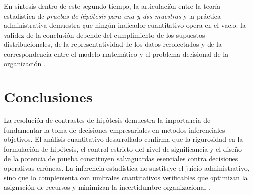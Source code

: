 {En síntesis dentro de este segundo tiempo, la articulación entre la teoría estadística de \textit{pruebas de hipótesis para una y dos muestras} y la práctica administrativa demuestra que ningún indicador cuantitativo opera en el vacío: la validez de la conclusión depende del cumplimiento de los supuestos distribucionales, de la representatividad de los datos recolectados y de la correspondencia entre el modelo matemático y el problema decisional de la organización \citep{anderson2012,nistHandbook,guarin2002}.

\clearpage
\section{Conclusiones}
La resolución de contrastes de hipótesis demuestra la importancia de fundamentar la toma de decisiones empresariales en métodos inferenciales objetivos. El análisis cuantitativo desarrollado confirma que la rigurosidad en la formulación de hipótesis, el control estricto del nivel de significancia y el diseño de la potencia de prueba constituyen salvaguardas esenciales contra decisiones operativas erróneas. La inferencia estadística no sustituye el juicio administrativo, sino que lo complementa con umbrales cuantitativos verificables que optimizan la asignación de recursos y minimizan la incertidumbre organizacional \citep{anderson2012,lind2012,wackerly2010,diazRodriguez2022}.
}

